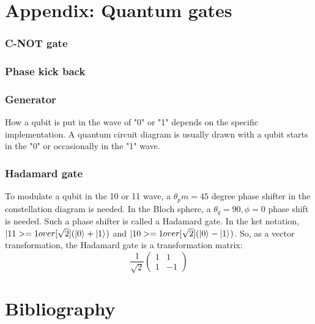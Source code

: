 \documentclass[Letter,11pt]{book}
\begin{document}
\chapter{Appendix: Quantum gates}

\subsection{C-NOT gate}
\subsection{Phase kick back}

\subsection{Generator}
How a qubit is put in the wave of "0" or "1" depends on the specific implementation. A quantum circuit diagram is usually drawn with a qubit starts in the "0" or occasionally in the "1" wave.

\subsection{Hadamard gate}
To modulate a qubit in the 10 or 11 wave, a $\theta_pm = 45$ degree phase shifter in the constellation diagram is needed. In the Bloch sphere, a $\theta_q =90, \phi=0$ phase shift is needed. Such a phase shifter is called a Hadamard gate. In the ket notation, $|11> = 1 over [\sqrt 2] (\vert {0} \rangle_{} + \vert {1} \rangle_{})$ and $|10> = 1 over [\sqrt 2] (\vert {0} \rangle_{} - \vert {1} \rangle_{})$. So, as a vector transformation, the Hadamard gate is a transformation matrix:
\begin{equation}
    \frac 1 {\sqrt 2}
    \begin{pmatrix}
1 & 1 \\
1 & -1
\end{pmatrix}
\end{equation}



\chapter*{Bibliography}

   

\printindex
\end{document}
